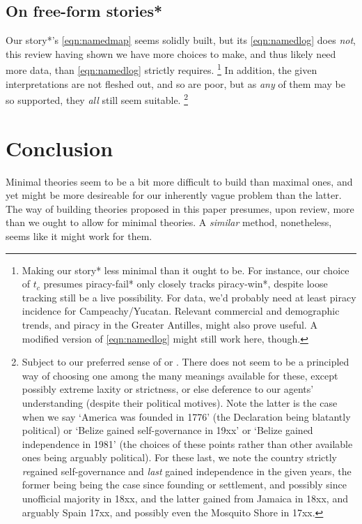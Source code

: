	\subsection{On free-form stories*}
	\label{ss:onfreestories}
		Our story*'s \ref{eqn:namedmap} seems solidly built, but its \ref{eqn:namedlog} does \emph{not}, this review having shown we have more choices to make, and thus likely need more data, than \ref{eqn:namedlog} strictly requires.%
		\footnote{Making our story* less minimal than it ought to be. For instance, our choice of \(t_c\) presumes piracy-fail* only closely tracks piracy-win*, despite loose tracking still be a live possibility. For data, we'd probably need at least piracy incidence  for Campeachy/Yucatan. Relevant commercial and demographic trends, and piracy in the Greater Antilles, might also prove useful. A modified version of \ref{eqn:namedlog} might still work here, though.}
		In addition, the given interpretations are not fleshed out, and so are poor, but as \emph{any} of them may be so supported, they \emph{all} still seem suitable.%
		\footnote{Subject to our preferred sense of  or . There does not seem to be a principled way of choosing one among the many meanings available for these, except possibly extreme laxity or strictness, or else deference to our agents' understanding (despite their political motives). Note the latter is the case when we say `America was founded in 1776' (the Declaration being blatantly political) or `Belize gained self-governance in 19xx' or `Belize gained independence in 1981' (the choices of these points rather than other available ones being arguably political). For these last, we note the country strictly \emph{re}gained self-governance and \emph{last} gained independence in the given years, the former being being the case since founding or settlement, and possibly since unofficial majority in 18xx, and the latter gained from Jamaica in 18xx, and arguably Spain 17xx, and possibly even the Mosquito Shore in 17xx.}
%
%
%
\section{Conclusion}
\label{s:concl}
	Minimal theories seem to be a bit more difficult to build than maximal ones, and yet might be more desireable for our inherently vague problem than the latter. The way of building theories proposed in this paper presumes, upon review, more than we ought to allow for minimal theories. A \emph{similar} method, nonetheless, seems like it might work for them.
%
%
%
